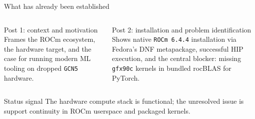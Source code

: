 \documentclass[aspectratio=169,11pt]{beamer}
\newcommand{\mono}[1]{\texttt{#1}}
\begin{document}
\begin{frame}[shrink=8]{What has already been established}
    \begin{columns}[T,onlytextwidth]
        \begin{block}{Post 1: context and motivation}
            Frames the ROCm ecosystem, the hardware target, and the case for running modern ML tooling on dropped \mono{GCN5} hardware.
        \end{block}

        \begin{block}{Post 2: installation and problem identification}
            Shows native \mono{ROCm 6.4.4} installation via Fedora's DNF metapackage, successful HIP execution, and the central blocker: missing \mono{gfx90c} kernels in bundled rocBLAS for PyTorch.
        \end{block}
    \end{columns}

    \vspace{0.35cm}
    \begin{alertblock}{Status signal}
        The hardware compute stack is functional; the unresolved issue is support continuity in ROCm userspace and packaged kernels.
    \end{alertblock}
\end{frame}
\end{document}
